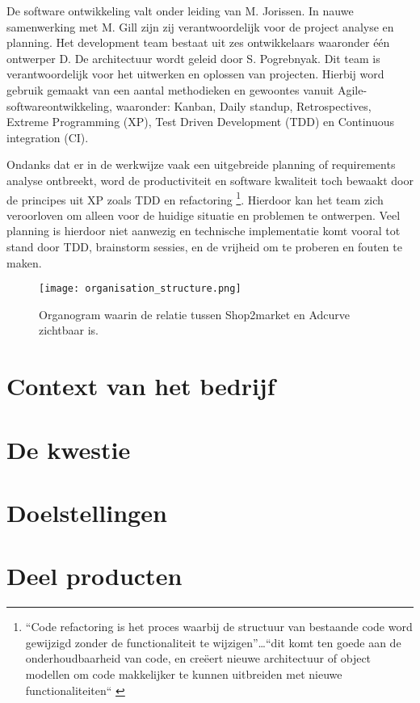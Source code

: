 De software ontwikkeling valt onder leiding van M. Jorissen. In nauwe samenwerking met M. Gill zijn zij verantwoordelijk voor de project analyse en planning. Het development team bestaat uit zes ontwikkelaars waaronder één ontwerper D.  De architectuur wordt geleid door S. Pogrebnyak. Dit team is verantwoordelijk voor het uitwerken en oplossen van projecten. Hierbij word gebruik gemaakt van een aantal methodieken en gewoontes vanuit Agile-softwareontwikkeling, waaronder: Kanban, Daily standup, Retrospectives, Extreme Programming (XP), Test Driven Development (TDD) en Continuous integration (CI).

Ondanks dat er in de werkwijze vaak een uitgebreide planning of requirements analyse ontbreekt, word de productiviteit en software kwaliteit toch bewaakt door de principes uit XP zoals TDD en refactoring \footnote{“Code refactoring is het proces waarbij de structuur van bestaande code word gewijzigd zonder de functionaliteit te wijzigen”…“dit komt ten goede aan de onderhoudbaarheid van code, en creëert nieuwe architectuur of object modellen om code makkelijker te kunnen uitbreiden met nieuwe functionaliteiten“ \parencite{refactoring}}. Hierdoor kan het team zich veroorloven om alleen voor de huidige situatie en problemen te ontwerpen. Veel planning is hierdoor niet aanwezig en technische implementatie komt vooral tot stand door TDD, brainstorm sessies, en de vrijheid om te proberen en fouten te maken.

\begin{figure}[h]
    \texttt{[image: organisation\_structure.png]}
    \caption{Organogram waarin de relatie tussen Shop2market en Adcurve zichtbaar is.}
    \label{fig:orgchart}
\end{figure}

\section{Context van het bedrijf} %


\section{De kwestie} %

\section{Doelstellingen} %

\section{Deel producten}




